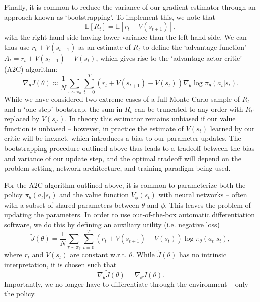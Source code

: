 Finally, it is common to reduce the variance of our gradient estimator through an approach known as `bootstrapping'.
To implement this, we note that
\begin{equation}
    \mathbb{E} \left [ R_t \right ] = \mathbb{E}[r_t + V(s_{t+1})],
\end{equation}
with the right-hand side having lower variance than the left-hand side.
We can thus use $r_t + V(s_{t+1})$ as an estimate of $R_t$ to define the `advantage function' $A_t = r_t + V(s_{t+1}) - V(s_t)$, which gives rise to the `advantage actor critic' (A2C) algorithm:
\begin{equation}
    \nabla_\theta J(\theta) \approx \frac{1}{N} \sum_{\tau \sim \pi_\theta}  \sum_{t=0}^T (r_t + V(s_{t+1}) - V(s_t)) \nabla_\theta \log \pi_\theta (a_t|s_t).
\end{equation}
While we have considered two extreme cases of a full Monte-Carlo sample of $R_t$ and a `one-step' bootstrap, the sum in $R_t$ can be truncated to any order with $R_{t'}$ replaced by $V(s_{t'})$.
In theory this estimator remains unbiased if our value function is unbiased -- however, in practice the estimate of $V(s_t)$ learned by our critic will be inexact, which introduces a bias to our parameter updates.
The bootstrapping procedure outlined above thus leads to a tradeoff between the bias and variance of our update step, and the optimal tradeoff will depend on the problem setting, network architecture, and training paradigm being used.

For the A2C algorithm outlined above, it is common to parameterize both the policy $\pi_\theta(a_t|s_t)$ and the value function $V_\phi(s_t)$ with neural networks -- often with a subset of shared parameters between $\theta$ and $\phi$.
This leaves the problem of updating the parameters.
In order to use out-of-the-box automatic differentiation software, we do this by defining an auxiliary utility (i.e. negative loss)
\begin{equation}
    \tilde{J}(\theta) = \frac{1}{N} \sum_{\tau \sim \pi_\theta}  \sum_{t=0}^T (r_t + V(s_{t+1}) - V(s_t)) \log \pi_\theta (a_t|s_t),
\end{equation}
where $r_t$ and $V(s_t)$ are constant w.r.t. $\theta$.
While $\tilde{J}(\theta)$ has no intrinsic interpretation, it is chosen such that
\begin{equation}
    \nabla_\theta \tilde{J}(\theta) = \nabla_\theta J(\theta).
\end{equation}
Importantly, we no longer have to differentiate through the environment -- only the policy.

